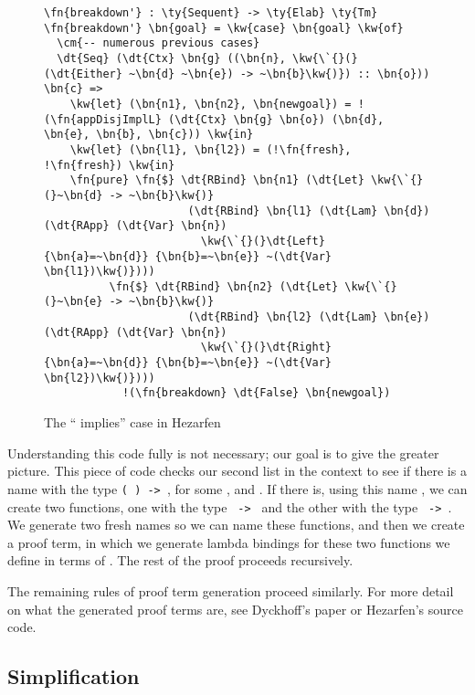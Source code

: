 \begin{figure}[ht]
\caption{The `` implies'' case in Hezarfen}
\label{code:hezarfenTypes}
\begin{Verbatim}[framesep=2mm, label=\footnotesize{\normalfont{Idris}}, labelposition=topline]
\fn{breakdown'} : \ty{Sequent} -> \ty{Elab} \ty{Tm}
\fn{breakdown'} \bn{goal} = \kw{case} \bn{goal} \kw{of}
  \cm{-- numerous previous cases}
  \dt{Seq} (\dt{Ctx} \bn{g} ((\bn{n}, \kw{\`{}(}(\dt{Either} ~\bn{d} ~\bn{e}) -> ~\bn{b}\kw{)}) :: \bn{o})) \bn{c} =>
    \kw{let} (\bn{n1}, \bn{n2}, \bn{newgoal}) = !(\fn{appDisjImplL} (\dt{Ctx} \bn{g} \bn{o}) (\bn{d}, \bn{e}, \bn{b}, \bn{c})) \kw{in}
    \kw{let} (\bn{l1}, \bn{l2}) = (!\fn{fresh}, !\fn{fresh}) \kw{in}
    \fn{pure} \fn{$} \dt{RBind} \bn{n1} (\dt{Let} \kw{\`{}(}~\bn{d} -> ~\bn{b}\kw{)}
                      (\dt{RBind} \bn{l1} (\dt{Lam} \bn{d}) (\dt{RApp} (\dt{Var} \bn{n})
                        \kw{\`{}(}\dt{Left} {\bn{a}=~\bn{d}} {\bn{b}=~\bn{e}} ~(\dt{Var} \bn{l1})\kw{)})))
          \fn{$} \dt{RBind} \bn{n2} (\dt{Let} \kw{\`{}(}~\bn{e} -> ~\bn{b}\kw{)}
                      (\dt{RBind} \bn{l2} (\dt{Lam} \bn{e}) (\dt{RApp} (\dt{Var} \bn{n})
                        \kw{\`{}(}\dt{Right} {\bn{a}=~\bn{d}} {\bn{b}=~\bn{e}} ~(\dt{Var} \bn{l2})\kw{)})))
            !(\fn{breakdown} \dt{False} \bn{newgoal})
\end{Verbatim}
\end{figure}

Understanding this code fully is not necessary; our goal is to give the greater
picture. This piece of code checks our second list in the context to see if
there is a name with the type \texttt{(  ) -> },
for some ,  and . If there is, using this name , we can
create two functions, one with the type \texttt{ -> } and the other
with the type \texttt{ -> }. We generate two fresh names so we can
name these functions, and then we create a proof term, in which we generate
lambda bindings for these two functions we define in terms of . The rest
of the proof proceeds recursively.

The remaining rules of proof term generation proceed similarly. For more detail
on what the generated proof terms are, see Dyckhoff's paper or Hezarfen's
source code.


\subsection{Simplification}

